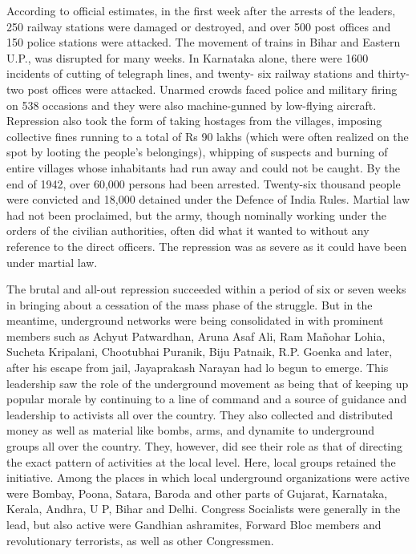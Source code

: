 \begin{multicols}{2}
According to official estimates, in the first week after the arrests of the leaders, 250 railway stations were damaged or destroyed, and over 500 post offices and 150 police stations were attacked. The movement of trains in Bihar and Eastern U.P., was disrupted for many weeks. In Karnataka alone, there were 1600 incidents of cutting of telegraph lines, and twenty- six railway stations and thirty-two post offices were attacked. Unarmed crowds faced police and military firing on 538 occasions and they were also machine-gunned by low-flying aircraft. Repression also took the form of taking hostages from the villages, imposing collective fines running to a total of Rs 90 lakhs (which were often realized on the spot by looting the people's belongings), whipping of suspects and burning of entire villages whose inhabitants had run away and could not be caught. By the end of 1942, over 60,000 persons had been arrested. Twenty-six thousand people were convicted and 18,000 detained under the Defence of India Rules. Martial law had not been proclaimed, but the army, though nominally working under the orders of the civilian authorities, often did what it wanted to without any reference to the direct officers. The repression was as severe as it could have been under martial law.

The brutal and all-out repression succeeded within a period of six or seven weeks in bringing about a cessation of the mass phase of the struggle. But in the meantime, underground networks were being consolidated in with prominent members such as Achyut Patwardhan, Aruna Asaf Ali, Ram Mañohar Lohia, Sucheta Kripalani, Chootubhai Puranik, Biju Patnaik, R.P. Goenka and later, after his escape from jail, Jayaprakash Narayan had lo begun to emerge. This leadership saw the role of the underground movement as being that of keeping up popular morale by continuing to a line of command and a source of guidance and leadership to activists all over the country. They also collected and distributed money as well as material like bombs, arms, and dynamite to underground groups all over the country. They, however, did see their role as that of directing the exact pattern of activities at the local level. Here, local groups retained the initiative. Among the places in which local underground organizations were active were Bombay, Poona, Satara, Baroda and other parts of Gujarat, Karnataka, Kerala, Andhra, U P, Bihar and Delhi. Congress Socialists were generally in the lead, but also active were Gandhian ashramites, Forward Bloc members and revolutionary terrorists, as well as other Congressmen.


\end{multicols}
